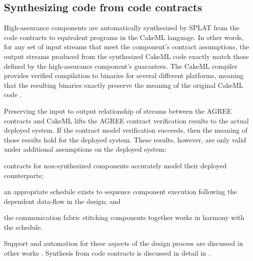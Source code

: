\subsection{Synthesizing code from code contracts}

High-assurance components are automatically synthesized by SPLAT from
the code contracts to equivalent programs in the CakeML
language.
 In other words, for any set of input streams that meet the
 component's contract assumptions, the output streams produced from
 the synthesized CakeML code exactly match those defined by the
 high-assurance component's guarantees.  The CakeML compiler provides
 verified compilation to binaries for several different platforms,
 meaning that the resulting binaries exactly preserve the meaning of
 the original CakeML code \cite{cakeml}.

Preserving the input to output relationship of streams between the
AGREE contracts and CakeML lifts the AGREE contract verification
results to the actual deployed system.  If the contract model
verification succeeds, then the meaning of those results hold for the
deployed system.  These results, however, are only valid under
additional assumptions on the deployed system:
\begin{compactitem}
\item contracts for non-synthesized components accurately model their deployed
counterparts;
\item an appropriate schedule exists to sequence component
  execution following the dependent data-flow in the design; and
\item the communication fabric stitching components together works in harmony
  with the schedule.
\end{compactitem}
\noindent Support and automation for these aspects of the design process are
discussed in other works \cite{gearcase2020, dcrypps2019, 10.1007/978-3-030-89159-6_18, 10.1007/978-3-030-89159-6_17, sel4-2009, scheduled-agree, 9734792}.
Synthesis from code contracts is discussed in detail in .